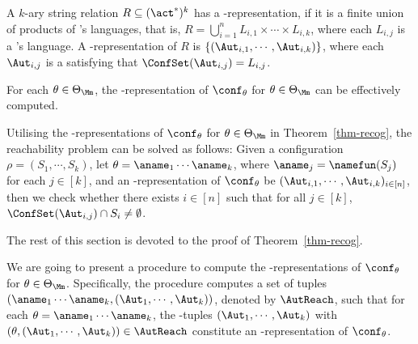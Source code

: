 \begin{definition}[{\WOTrNFA}-representation]
    A $k$-ary string relation $R \subseteq (\act^*)^k$ has a {\WOTrNFA}-representation, if it is a finite union of products of {\WOTrNFA}'s languages, that is, $R=\bigcup \limits_{i =1 }^n L_{i,1} \times \cdots \times L_{i, k}$, where each $L_{i,j}$ is a {\WOTrNFA}'s language.
    A {\WOTrNFA}-representation of $R$ is $\{(\Aut_{i,1},\cdots,\Aut_{i,k})\}$, where each $\Aut_{i,j}$ is a {\WOTrNFA} satisfying that $\ConfSet(\Aut_{i,j})= L_{i,j}$.
\end{definition}
%

\begin{theorem}\label{thm-recog}
    For each $\theta \in \Theta_\Mm$, the {\WOTrNFA}-representation of $\conf_\theta$ for $\theta \in \Theta_\Mm$ can be effectively computed.
\end{theorem} 

Utilising the {\WOTrNFA}-representations of $\conf_\theta$ for $\theta \in \Theta_\Mm$ in Theorem~\ref{thm-recog}, the reachability problem can be solved as follows: Given a configuration $\rho = (S_1, \cdots, S_k)$, let $\theta = \aname_1 \cdots \aname_k$, where $\aname_j=\namefun(S_j)$ for each $j \in [k]$, and an {\WOTrNFA}-representation of $\conf_\theta$ be $(\Aut_{i,1},\cdots,\Aut_{i,k})_{i \in [n]}$, then we check whether there exists $i \in [n]$ such that  for all $j \in [k]$, 
$\ConfSet(\Aut_{i,j})\cap S_i\neq\emptyset$.


The rest of this section is devoted to the proof of Theorem~\ref{thm-recog}. 


We are going to present a procedure to compute the {\WOTrNFA}-representations of $\conf_\theta$ for $\theta \in \Theta_\Mm$. 
Specifically, the procedure computes a set of tuples $(\aname_1 \cdots \aname_k, (\Aut_1, \cdots, \Aut_k))$, denoted by $\AutReach$, such that for each $\theta =  \aname_1 \cdots \aname_k$, the {\WOTrNFA}-tuples $(\Aut_1, \cdots, \Aut_k)$ with $(\theta, (\Aut_1, \cdots, \Aut_k)) \in \AutReach$ constitute an {\WOTrNFA}-representation of $\conf_\theta$. 

